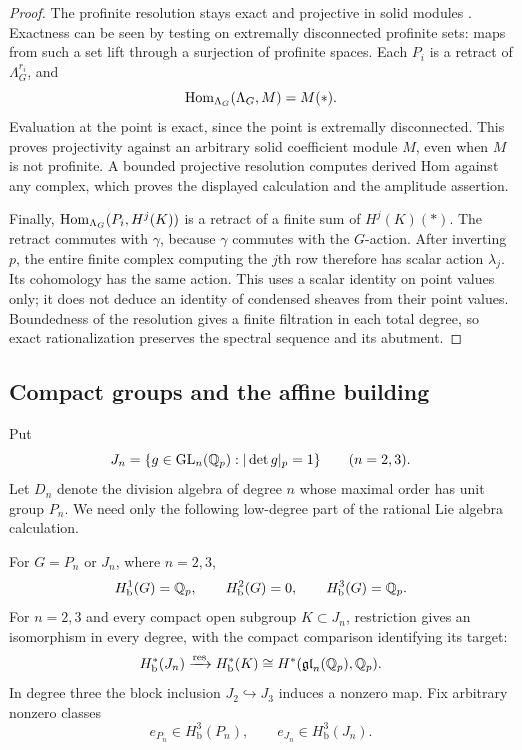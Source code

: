 \begin{proof}
The profinite resolution stays exact and projective in solid
modules \cite[Theorems~3.2 and~3.14(i)]{Tang2026}.
Exactness can be seen by testing on extremally
disconnected profinite sets: maps from such a set lift through a
surjection of profinite spaces.  Each $P_i$ is a retract of
$\Lambda_G^{r_i}$, and
\[
 \operatorname{Hom}_{\Lambda_G}(\Lambda_G,M)=M(*).
\]
Evaluation at the point is exact, since the point is extremally
disconnected.  This proves projectivity against an arbitrary solid
coefficient module $M$, even when $M$ is not profinite.  A bounded
projective resolution computes derived Hom against any complex,
which proves the displayed calculation and the amplitude assertion.

Finally, $\operatorname{Hom}_{\Lambda_G}(P_i,H^j(K))$ is a retract of a finite
sum of $H^j(K)(*)$.  The retract commutes with $\gamma$, because
$\gamma$ commutes with the $G$-action.  After inverting $p$, the
entire finite complex computing the $j$th row therefore has scalar
action $\lambda_j$.  Its cohomology has the same action.
This uses a scalar identity on point values only; it does not
deduce an identity of condensed sheaves from their point values.
Boundedness of the resolution gives a finite filtration in each
total degree, so exact rationalization preserves the spectral
sequence and its abutment.
\end{proof}

\subsection{Compact groups and the affine building}

Put
\[
 J_n=\{g\in\operatorname{GL}_n(\mathbb Q_p):|\det g|_p=1\}\qquad(n=2,3).
\]
Let $D_n$ denote the division algebra of degree $n$ whose maximal
order has unit group $P_n$.  We need only the following low-degree
part of the rational Lie algebra calculation.

\begin{proposition}
\label{prop:group-classes}
For $G=P_n$ or $J_n$, where $n=2,3$,
\[
 H^1_{\mathrm b}(G)=\mathbb Q_p,
 \qquad H^2_{\mathrm b}(G)=0,
 \qquad H^3_{\mathrm b}(G)=\mathbb Q_p.
\]
For $n=2,3$ and every compact open subgroup $K\subset J_n$,
restriction gives an isomorphism in every degree, with the compact
comparison identifying its target:
\[
 H^*_{\mathrm b}(J_n)\xrightarrow{\mathrm{res}}H^*_{\mathrm b}(K)
 \cong H^*(\mathfrak{gl}_n(\mathbb Q_p),\mathbb Q_p).
\]
In degree three the block inclusion $J_2\hookrightarrow J_3$
induces a nonzero map.  Fix arbitrary nonzero classes
\[
 e_{P_n}\in H^3_{\mathrm b}(P_n),\qquad
 e_{J_n}\in H^3_{\mathrm b}(J_n).
\]
\end{proposition}

